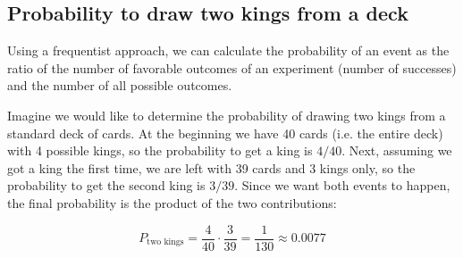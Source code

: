\subsection{Probability to draw two kings from a deck}
Using a frequentist approach, we can calculate the probability of an event as the ratio of the number of favorable outcomes of an experiment (number of successes) and the number of all possible outcomes. 

Imagine we would like to determine the probability of drawing two kings from a standard deck of cards. At the beginning we have 40 cards (i.e. the entire deck) with 4 possible kings, so the probability to get a king is $4/40$. Next, assuming we got a king the first time, we are left with 39 cards and 3 kings only, so the probability to get the second king is $3/39$. Since we want both events to happen, the final probability is the product of the two contributions:

\begin{equation*}
P_\textrm{two kings} = \frac{4}{40} \cdot \frac{3}{39} = \frac{1}{130} \approx 0.0077
\end{equation*}

